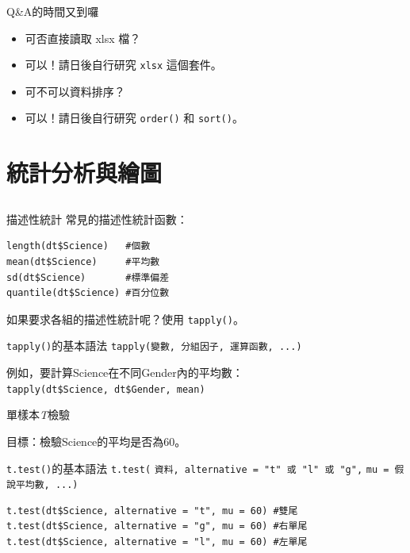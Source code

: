 \documentclass[12pt, aspectratio=43]{beamer}
\begin{document}
\begin{frame}[fragile]{Q\&A的時間又到囉}
\begin{itemize}
\item[Q] 可否直接讀取 xlsx 檔？\\
\item[A] 可以！請日後自行研究 \verb+xlsx+ 這個套件。
\end{itemize}
\begin{itemize}
\item[Q] 可不可以資料排序？\\
\item[A] 可以！請日後自行研究 \verb+order()+ 和 \verb+sort()+。
\end{itemize}
\end{frame}


\section{統計分析與繪圖}\subsection{}

\begin{frame}[fragile]{描述性統計}
常見的描述性統計函數：
\begin{verbatim}
length(dt$Science)   #個數
mean(dt$Science)     #平均數
sd(dt$Science)       #標準偏差
quantile(dt$Science) #百分位數
\end{verbatim}

如果要求各組的描述性統計呢？使用 \verb+tapply()+。
\begin{block}{\texttt{tapply()}的基本語法}
\verb+tapply(變數, 分組因子, 運算函數, ...)+
\end{block}
例如，要計算Science在不同Gender內的平均數：\\
\verb+tapply(dt$Science, dt$Gender, mean)+\\
\end{frame}

\begin{frame}[fragile]{單樣本\emph{T}檢驗}

目標：檢驗Science的平均是否為60。
\begin{block}{\texttt{t.test()}的基本語法}
\verb+t.test(+
  \verb+資料, alternative = "t" 或 "l" 或 "g",+
  \verb+mu = 假說平均數, ...)+
\end{block}
\begin{verbatim}
t.test(dt$Science, alternative = "t", mu = 60) #雙尾
t.test(dt$Science, alternative = "g", mu = 60) #右單尾
t.test(dt$Science, alternative = "l", mu = 60) #左單尾
\end{verbatim}
\end{frame}
\end{document}

